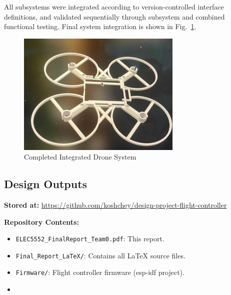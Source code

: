 \noindent All subsystems were integrated according to version-controlled interface definitions, and validated sequentially through subsystem and combined functional testing. Final system integration is shown in Fig.~\ref{fig:complete-drone}.

\begin{figure}[H]
    \centering
    \includegraphics[width=0.7\textwidth]{img/frame-placeholder.png}
    \caption{Completed Integrated Drone System }
    \label{fig:complete-drone}
\end{figure}

\pagebreak


\pagebreak


\pagebreak


\subsection{Design Outputs}
\textbf{Stored at:} \url{https://github.com/koshchey/design-project-flight-controller}

\textbf{Repository Contents:}
\begin{itemize}
    \item \texttt{ELEC5552\_FinalReport\_Team0.pdf}: This report.
    \item \texttt{Final\_Report\_LaTeX/}: Contains all \LaTeX{} source files.
    \item \texttt{Firmware/}: Flight controller firmware (\gls{esp-idf} project).
    \item {}
\end{itemize}

